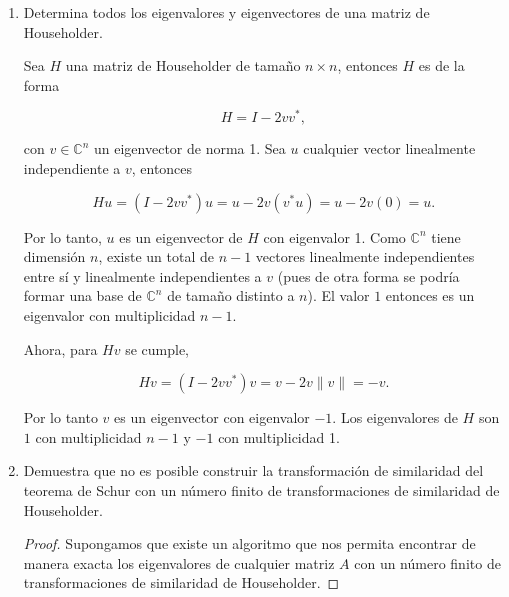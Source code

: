 \documentclass{article}
\renewcommand{\C}{\mathbb{C}}
\begin{document}
\begin{enumerate}
    Cuando ejecutamos el código con 10 iteraciones, obtenemos los siguientes valores

\begin{lstlisting}[language=Python]
[array([8.23614095, 3.76735469, 0.99650436]),
array([8.23606798, 3.76393237, 0.99999965]),
array([8.23606798, 3.76393203, 1.        ]),
array([8.23606798, 3.76393202, 1.        ])]\end{lstlisting}

    Los valores coinciden exactamente con los que obtenemos para 10,000 iteraciones. Concluimos
    que en este caso la convergencia del algoritmo bastante rápida.

    \item Determina todos los eigenvalores y eigenvectores de una matriz de Householder.
    
    Sea $H$ una matriz de Householder de tamaño $n\times n$, entonces $H$ es de la forma

    \[ H = I - 2vv^*, \]

    con $v \in \C^{n}$ un eigenvector de norma 1. Sea $u$ cualquier vector linealmente independiente a $v$, entonces

    \[ Hu = (I - 2vv^*)u = u - 2v(v^*u) = u - 2v(0) = u. \]

    Por lo tanto, $u$ es un eigenvector de $H$ con eigenvalor 1. Como $\C^n$ tiene dimensión $n$,
    existe un total de $n-1$ vectores linealmente independientes entre sí y linealmente independientes
    a $v$ (pues de otra forma se podría formar una base de $\C^n$ de tamaño distinto a $n$). El valor
    $1$ entonces es un eigenvalor con multiplicidad $n-1$.

    Ahora, para $Hv$ se cumple,

    \[ Hv = (I - 2vv^*)v = v - 2v\|v\| = -v. \]

    Por lo tanto $v$ es un eigenvector con eigenvalor $-1$. Los eigenvalores de $H$ son $1$ con
    multiplicidad $n-1$ y $-1$ con multiplicidad 1.

    \item Demuestra que no es posible construir la transformación de similaridad del 
    teorema de Schur con un número finito de transformaciones de similaridad de 
    Householder.

    \begin{proof}
        Supongamos que existe un algoritmo que nos permita encontrar de manera exacta los eigenvalores
        de cualquier matriz $A$ con un número finito de transformaciones de similaridad de Householder.


\end{proof}
\end{enumerate}
\end{document}
